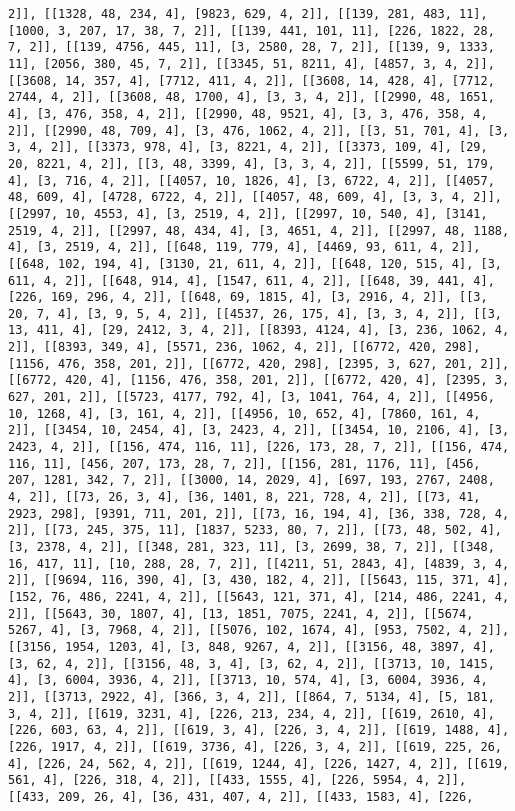 \documentclass[12pt,fleqn]{article}\usepackage{../../common}
\begin{document}
\begin{verbatim}
2]], [[1328, 48, 234, 4], [9823, 629, 4, 2]], [[139, 281, 483, 11], [1000, 3, 207, 17, 38, 7, 2]], [[139, 441, 101, 11], [226, 1822, 28, 7, 2]], [[139, 4756, 445, 11], [3, 2580, 28, 7, 2]], [[139, 9, 1333, 11], [2056, 380, 45, 7, 2]], [[3345, 51, 8211, 4], [4857, 3, 4, 2]], [[3608, 14, 357, 4], [7712, 411, 4, 2]], [[3608, 14, 428, 4], [7712, 2744, 4, 2]], [[3608, 48, 1700, 4], [3, 3, 4, 2]], [[2990, 48, 1651, 4], [3, 476, 358, 4, 2]], [[2990, 48, 9521, 4], [3, 3, 476, 358, 4, 2]], [[2990, 48, 709, 4], [3, 476, 1062, 4, 2]], [[3, 51, 701, 4], [3, 3, 4, 2]], [[3373, 978, 4], [3, 8221, 4, 2]], [[3373, 109, 4], [29, 20, 8221, 4, 2]], [[3, 48, 3399, 4], [3, 3, 4, 2]], [[5599, 51, 179, 4], [3, 716, 4, 2]], [[4057, 10, 1826, 4], [3, 6722, 4, 2]], [[4057, 48, 609, 4], [4728, 6722, 4, 2]], [[4057, 48, 609, 4], [3, 3, 4, 2]], [[2997, 10, 4553, 4], [3, 2519, 4, 2]], [[2997, 10, 540, 4], [3141, 2519, 4, 2]], [[2997, 48, 434, 4], [3, 4651, 4, 2]], [[2997, 48, 1188, 4], [3, 2519, 4, 2]], [[648, 119, 779, 4], [4469, 93, 611, 4, 2]], [[648, 102, 194, 4], [3130, 21, 611, 4, 2]], [[648, 120, 515, 4], [3, 611, 4, 2]], [[648, 914, 4], [1547, 611, 4, 2]], [[648, 39, 441, 4], [226, 169, 296, 4, 2]], [[648, 69, 1815, 4], [3, 2916, 4, 2]], [[3, 20, 7, 4], [3, 9, 5, 4, 2]], [[4537, 26, 175, 4], [3, 3, 4, 2]], [[3, 13, 411, 4], [29, 2412, 3, 4, 2]], [[8393, 4124, 4], [3, 236, 1062, 4, 2]], [[8393, 349, 4], [5571, 236, 1062, 4, 2]], [[6772, 420, 298], [1156, 476, 358, 201, 2]], [[6772, 420, 298], [2395, 3, 627, 201, 2]], [[6772, 420, 4], [1156, 476, 358, 201, 2]], [[6772, 420, 4], [2395, 3, 627, 201, 2]], [[5723, 4177, 792, 4], [3, 1041, 764, 4, 2]], [[4956, 10, 1268, 4], [3, 161, 4, 2]], [[4956, 10, 652, 4], [7860, 161, 4, 2]], [[3454, 10, 2454, 4], [3, 2423, 4, 2]], [[3454, 10, 2106, 4], [3, 2423, 4, 2]], [[156, 474, 116, 11], [226, 173, 28, 7, 2]], [[156, 474, 116, 11], [456, 207, 173, 28, 7, 2]], [[156, 281, 1176, 11], [456, 207, 1281, 342, 7, 2]], [[3000, 14, 2029, 4], [697, 193, 2767, 2408, 4, 2]], [[73, 26, 3, 4], [36, 1401, 8, 221, 728, 4, 2]], [[73, 41, 2923, 298], [9391, 711, 201, 2]], [[73, 16, 194, 4], [36, 338, 728, 4, 2]], [[73, 245, 375, 11], [1837, 5233, 80, 7, 2]], [[73, 48, 502, 4], [3, 2378, 4, 2]], [[348, 281, 323, 11], [3, 2699, 38, 7, 2]], [[348, 16, 417, 11], [10, 288, 28, 7, 2]], [[4211, 51, 2843, 4], [4839, 3, 4, 2]], [[9694, 116, 390, 4], [3, 430, 182, 4, 2]], [[5643, 115, 371, 4], [152, 76, 486, 2241, 4, 2]], [[5643, 121, 371, 4], [214, 486, 2241, 4, 2]], [[5643, 30, 1807, 4], [13, 1851, 7075, 2241, 4, 2]], [[5674, 5267, 4], [3, 7968, 4, 2]], [[5076, 102, 1674, 4], [953, 7502, 4, 2]], [[3156, 1954, 1203, 4], [3, 848, 9267, 4, 2]], [[3156, 48, 3897, 4], [3, 62, 4, 2]], [[3156, 48, 3, 4], [3, 62, 4, 2]], [[3713, 10, 1415, 4], [3, 6004, 3936, 4, 2]], [[3713, 10, 574, 4], [3, 6004, 3936, 4, 2]], [[3713, 2922, 4], [366, 3, 4, 2]], [[864, 7, 5134, 4], [5, 181, 3, 4, 2]], [[619, 3231, 4], [226, 213, 234, 4, 2]], [[619, 2610, 4], [226, 603, 63, 4, 2]], [[619, 3, 4], [226, 3, 4, 2]], [[619, 1488, 4], [226, 1917, 4, 2]], [[619, 3736, 4], [226, 3, 4, 2]], [[619, 225, 26, 4], [226, 24, 562, 4, 2]], [[619, 1244, 4], [226, 1427, 4, 2]], [[619, 561, 4], [226, 318, 4, 2]], [[433, 1555, 4], [226, 5954, 4, 2]], [[433, 209, 26, 4], [36, 431, 407, 4, 2]], [[433, 1583, 4], [226, 
\end{verbatim}
\end{document}
